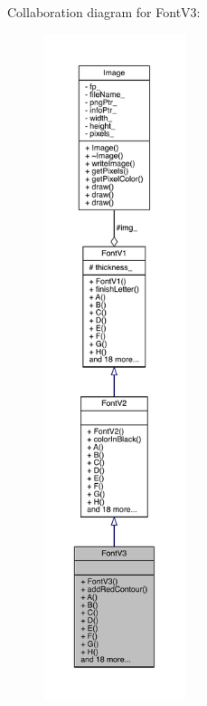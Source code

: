 Collaboration diagram for Font\+V3\+:\nopagebreak
\begin{figure}[H]
\begin{center}
\leavevmode
\includegraphics[height=550pt]{class_font_v3__coll__graph}
\end{center}
\end{figure}
